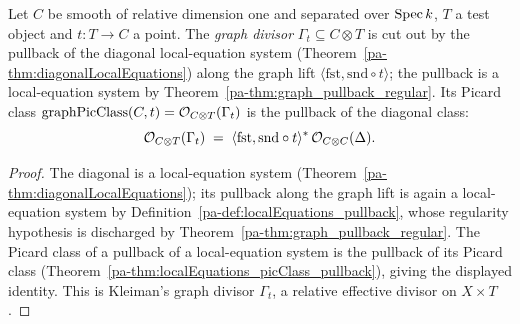\begin{definition}
  \label{pa-def:graphLocalEquations}
  \leanok

  Let \(C\) be smooth of relative dimension one and separated over \(\operatorname{Spec} k\), \(T\) a test object
  and \(t \colon T \to C\) a point. The \emph{graph divisor} \(\Gamma_t \subseteq C \otimes T\) is
  cut out by the pullback of the diagonal local-equation system
  (Theorem~\ref{pa-thm:diagonalLocalEquations}) along the graph lift \(\langle \mathrm{fst},
  \mathrm{snd} \circ t\rangle\); the pullback is a local-equation system by
  Theorem~\ref{pa-thm:graph_pullback_regular}. Its Picard class \(\mathrm{graphPicClass}(C, t) =
  \mathcal{O}_{C \otimes T}(\Gamma_t)\) is the pullback of the diagonal class:
  \[
    \mathcal{O}_{C \otimes T}(\Gamma_t)
      \;=\; \langle \mathrm{fst}, \mathrm{snd} \circ t\rangle^{*}\,\mathcal{O}_{C \otimes C}(\Delta).
  \]
\end{definition}
\begin{proof}
  \leanok
  The diagonal is a local-equation system (Theorem~\ref{pa-thm:diagonalLocalEquations}); its pullback
  along the graph lift is again a local-equation system by
  Definition~\ref{pa-def:localEquations_pullback}, whose regularity hypothesis is discharged by
  Theorem~\ref{pa-thm:graph_pullback_regular}. The Picard class of a pullback of a local-equation
  system is the pullback of its Picard class (Theorem~\ref{pa-thm:localEquations_picClass_pullback}),
  giving the displayed identity. This is Kleiman's graph divisor \(\Gamma_t\), a relative effective
  divisor on \(X \times T\).
\end{proof}

